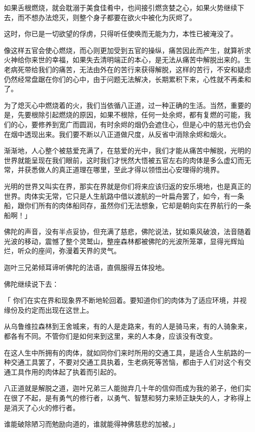 \documentclass[twoside,openany]{book}
\begin{document}
如果舌根燃烧，就会耽溺于美食佳肴中，也间接引燃贪婪之心，如果火势继续下去，而不想办法熄灭，则整个身子都要在欲火中被化为灰烬了。

这时，你已是一切欲望的俘虏，只得听任使唤而无能为力，本性已被淹没了。

像这样五官会使心燃烧，而心则更加受到五官的操纵，痛苦因此而产生，就算祈求火神给你来世的幸福，如果失去清明端正的本心，是无法从痛苦中解脱出来的。生老病死带给我们的痛苦，无法由外在的苦行来获得解脱，这样的苦行，不安和疑虑仍然经常盘踞在你们的心中，由于问题无法解决，长期累积下来，心性就不再柔和了。

为了熄灭心中燃烧着的火，我们当依循八正道，过一种正确的生活。当然，重要的是，先要根除引起燃烧的原因，如果不根除，任何一处余烬，都有复燃的可能，我们的心，要修养到宽广而圆润，有时余烬的烟仍会遮住心，但是心中的慈光也仍会在烟中透现出来。我们要不断以八正道做尺度，从反省中消除余烬和烟火。

渐渐地，人心整个被慈爱充满了，在慈爱的光中，我们才能从痛苦中解脱，光明的世界就能呈现在我们眼前，这时我们才恍然大悟被五官左右的肉体是多么虚幻而无常，并获悉做人的真正道理在哪里，至此才得以领悟出心安理得的境界。

光明的世界又叫实在界，那实在界就是你们将来应该归返的安乐境地，也是真正的世界。肉体实无常，它只是人生航路中借以渡航的一叶扁舟罢了，如今，有一条船，跟你们所有的肉体船同存，虽然你们无法想象，它却是朝向实在界航行的一条船啊！」

佛陀的声音，没有半点妥协，但充满了慈悲，佛陀说法，犹如乘风破浪，法音随着光波的移动，震憾了整个灵鹫山，整座森林都被佛陀的光波所笼罩，显得光辉灿烂，听众的座间，弥漫着天界的灵气。

迦叶三兄弟倾耳谛听佛陀的法语，直佩服得五体投地。

佛陀继续说下去：

「  你们在实在界和现象界不断地轮回着。要知道你们的肉体为了适应环境，并视缘份及约定而出现在这世上。

从乌鲁维拉森林到王舍城来，有的人是走路来，有的人是骑马来，有的人骑象来，都各有不同。不管你们是如何来到这里，来的人本身，应该没有改变。

在这人生中所拥有的肉体，就如同你们来时所用的交通工具，是适合人生航路的一种交通工具罢了，不要对交通工具执着，生老病死等苦恼，都由于人们对这个有交通工具作用的肉体起了执着而引起的。

八正道就是解脱之道，迦叶兄弟三人能抛弃几十年的信仰而成为我的弟子，他们实在很了不起，是有勇气的修行者，以勇气、智慧和努力来矫正缺失的人，才称得上是消灭了心火的修行者。

谁能破除陋习而勉励向道的，谁就能得神佛慈悲的加被。」
\end{document}
